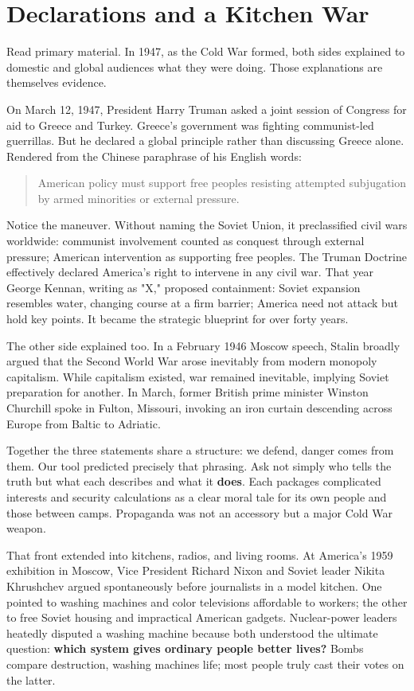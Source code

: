 \section{Declarations and a Kitchen War}
Read primary material. In 1947, as the Cold War formed, both sides explained to domestic and global audiences what they were doing. Those explanations are themselves evidence.

On March 12, 1947, President Harry Truman asked a joint session of Congress for aid to Greece and Turkey. Greece's government was fighting communist-led guerrillas. But he declared a global principle rather than discussing Greece alone. Rendered from the Chinese paraphrase of his English words:

\begin{quote}
American policy must support free peoples resisting attempted subjugation by armed minorities or external pressure.
\end{quote}
Notice the maneuver. Without naming the Soviet Union, it preclassified civil wars worldwide: communist involvement counted as conquest through external pressure; American intervention as supporting free peoples. The Truman Doctrine effectively declared America's right to intervene in any civil war. That year George Kennan, writing as "X," proposed containment: Soviet expansion resembles water, changing course at a firm barrier; America need not attack but hold key points. It became the strategic blueprint for over forty years.

The other side explained too. In a February 1946 Moscow speech, Stalin broadly argued that the Second World War arose inevitably from modern monopoly capitalism. While capitalism existed, war remained inevitable, implying Soviet preparation for another. In March, former British prime minister Winston Churchill spoke in Fulton, Missouri, invoking an iron curtain descending across Europe from Baltic to Adriatic.

Together the three statements share a structure: we defend, danger comes from them. Our tool predicted precisely that phrasing. Ask not simply who tells the truth but what each describes and what it \textbf{does}. Each packages complicated interests and security calculations as a clear moral tale for its own people and those between camps. Propaganda was not an accessory but a major Cold War weapon.

That front extended into kitchens, radios, and living rooms. At America's 1959 exhibition in Moscow, Vice President Richard Nixon and Soviet leader Nikita Khrushchev argued spontaneously before journalists in a model kitchen. One pointed to washing machines and color televisions affordable to workers; the other to free Soviet housing and impractical American gadgets. Nuclear-power leaders heatedly disputed a washing machine because both understood the ultimate question: \textbf{which system gives ordinary people better lives?} Bombs compare destruction, washing machines life; most people truly cast their votes on the latter.

